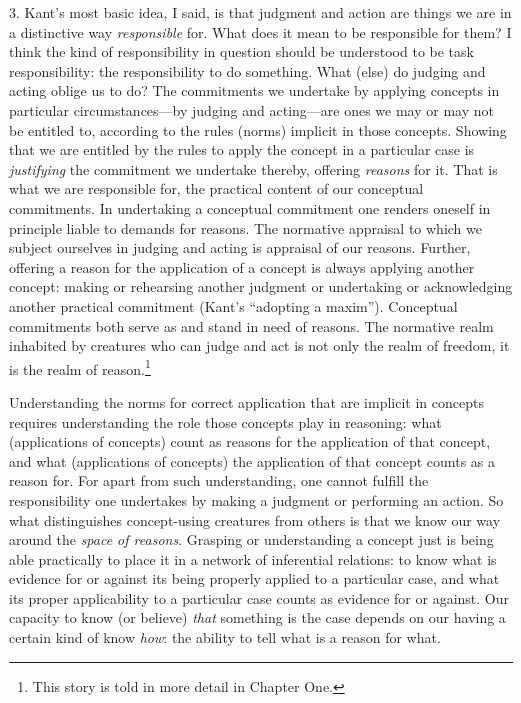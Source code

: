 3. Kant's most basic idea, I said, is that judgment and action are
things we are in a distinctive way \emph{responsible} for. What does it
mean to be responsible for them? I think the kind of responsibility in
question should be understood to be task responsibility: the
responsibility to do something. What (else) do judging and acting oblige
us to do? The commitments we undertake by applying concepts in
particular circumstances---by judging and acting---are ones we may or
may not be entitled to, according to the rules (norms) implicit in those
concepts. Showing that we are entitled by the rules to apply the concept
in a particular case is \emph{justifying} the commitment we undertake
thereby, offering \emph{reasons} for it. That is what we are responsible
for, the practical content of our conceptual commitments. In undertaking
a conceptual commitment one renders oneself in principle liable to
demands for reasons. The normative appraisal to which we subject
ourselves in judging and acting is appraisal of our reasons. Further,
offering a reason for the application of a concept is always applying
another concept: making or rehearsing another judgment or undertaking or
acknowledging another practical commitment (Kant's ``adopting a
maxim''). Conceptual commitments both serve as and stand in need of
reasons. The normative realm inhabited by creatures who can judge and
act is not only the realm of freedom, it is the realm of
reason.\footnote{This story is told in more detail in Chapter One.}

Understanding the norms for correct application that are implicit in
concepts requires understanding the role those concepts play in
reasoning: what (applications of concepts) count as reasons for the
application of that concept, and what (applications of concepts) the
application of that concept counts as a reason for. For apart from such
understanding, one cannot fulfill the responsibility one undertakes by
making a judgment or performing an action. So what distinguishes
concept-using creatures from others is that we know our way around the
\emph{space of reasons}. Grasping or understanding a concept just is
being able practically to place it in a network of inferential
relations: to know what is evidence for or against its being properly
applied to a particular case, and what its proper applicability to a
particular case counts as evidence for or against. Our capacity to know
(or believe) \emph{that} something is the case depends on our having a
certain kind of know \emph{how}: the ability to tell what is a reason
for what.


